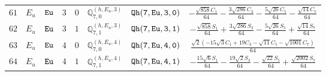 \documentclass[fleqn,8pt]{jsarticle}
\begin{document}
\begin{table}[ht!]
\begin{center}
\begin{tabular}{cccccccc}
$ 61 $ & $ E_{u} $ & $ {\tt Eu} $ & $ 3 $ & $ 0 $ & $ \mathbb{Q}_{7,0}^{(h,E_{u},3)} $ & $ {\tt Qh(7,Eu,3,0)} $ & $ - \frac{\sqrt{858} C_{1}}{64} - \frac{3 \sqrt{286} C_{3}}{64} - \frac{5 \sqrt{26} C_{5}}{64} - \frac{\sqrt{14} C_{7}}{64} $ \\
$ 62 $ & $ E_{u} $ & $ {\tt Eu} $ & $ 3 $ & $ 1 $ & $ \mathbb{Q}_{7,1}^{(h,E_{u},3)} $ & $ {\tt Qh(7,Eu,3,1)} $ & $ - \frac{\sqrt{858} S_{1}}{64} + \frac{3 \sqrt{286} S_{3}}{64} - \frac{5 \sqrt{26} S_{5}}{64} + \frac{\sqrt{14} S_{7}}{64} $ \\
$ 63 $ & $ E_{u} $ & $ {\tt Eu} $ & $ 4 $ & $ 0 $ & $ \mathbb{Q}_{7,0}^{(h,E_{u},4)} $ & $ {\tt Qh(7,Eu,4,0)} $ & $ \frac{\sqrt{2} \left(- 15 \sqrt{3} C_{1} + 19 C_{3} - \sqrt{11} C_{5} - \sqrt{1001} C_{7}\right)}{64} $ \\
$ 64 $ & $ E_{u} $ & $ {\tt Eu} $ & $ 4 $ & $ 1 $ & $ \mathbb{Q}_{7,1}^{(h,E_{u},4)} $ & $ {\tt Qh(7,Eu,4,1)} $ & $ - \frac{15 \sqrt{6} S_{1}}{64} - \frac{19 \sqrt{2} S_{3}}{64} - \frac{\sqrt{22} S_{5}}{64} + \frac{\sqrt{2002} S_{7}}{64} $ \\
 \hline \hline
\end{tabular}
\end{center}
\end{table}
\end{document}
